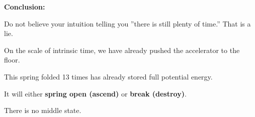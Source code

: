 \textbf{Conclusion:}

Do not believe your intuition telling you ''there is still plenty of time.'' That is a lie.

On the scale of intrinsic time, we have already pushed the accelerator to the floor.

This spring folded 13 times has already stored full potential energy.

It will either \textbf{spring open (ascend)} or \textbf{break (destroy)}.

There is no middle state.

